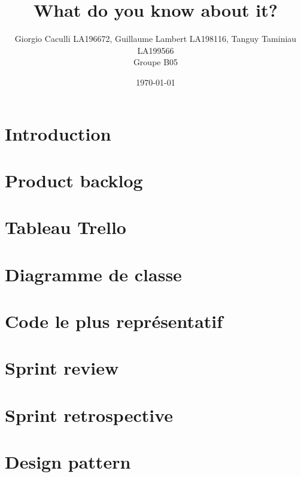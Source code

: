 \documentclass[10pt]{article}
\title{What do you know about it?}
\author{Giorgio Caculli LA196672, Guillaume Lambert LA198116, Tanguy Taminiau LA199566 \\ Groupe B05}
\date{\today}
\begin{document}
\maketitle

\newpage
\tableofcontents

\newpage
\section*{Introduction}
\label{sec:intro}


\begin{comment}
\newpage
\section{Analyse de l'existant}


\section{Description général de l'application}

\end{comment}

\section{Product backlog}


\section{Tableau Trello}


\newpage
\section{Diagramme de classe}


\begin{comment}
\newpage
\section{Plan de sortie}


\newpage
\section{Prototype}

\end{comment}

\newpage
\section{Code le plus représentatif}


\newpage
\section{Sprint review}


\section{Sprint retrospective}


\section{Design pattern}


\newpage
\printglossary
\end{document}
